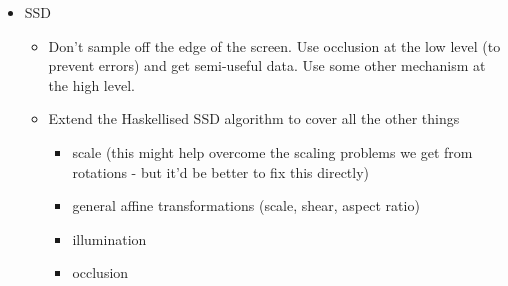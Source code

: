 \begin{itemize}
\begin{itemize}
\begin{verbatim}
Obviously, we're going to build lots of composite trackers that look
roughly like \verb+intersect+, so we'll probably want to abstract 
out the functions for combining up data and for splitting down data.
Presumably this means we end up with a family of functions like this:

\begin{verbatim}
-- warning: these types are kinda scrogged.
-- things will be much easier to figure out once we actually
-- do this stuff.
track1 :: (u -> d) -> (d -> u) -> Tracker u d -> Tracker u d
track2 :: (u -> d1) -> (u -> d2)) -> ((d1,d2) -> u) -> 
          Tracker u d1 -> Tracker u d2 -> Tracker u d
...
\end{verbatim}

\item how to combine trackers with robots

\item how to run different parts of the system at different speeds
  Pipe.subsample and Pipe.oversample are initial moves in this
  direction.

\item
Error recovery

If we try to track an image that goes off the screen, we lose.
Where to insert the code that guards against this?

Something to do with window edge effects Compute a weighting matrix to
handle getting rid of window edge effects

\item performance issues: 
\begin{itemize}
\item memory usage
\item cache usage
\item temporal sharing
\end{itemize}
\end{itemize}


\item
SSD
\begin{itemize} %
\item
Don't sample off the edge of the screen.
Use occlusion at the low level (to prevent errors) and get semi-useful data.
Use some other mechanism at the high level.

\item
Extend the Haskellised SSD algorithm to cover all the other things

\begin{itemize}
\item scale (this might help overcome the scaling problems we get from 
      rotations - but it'd be better to fix this directly)
\item general affine transformations (scale, shear, aspect ratio)
\item illumination
\item occlusion
\end{itemize}


\end{itemize}
\end{itemize}
